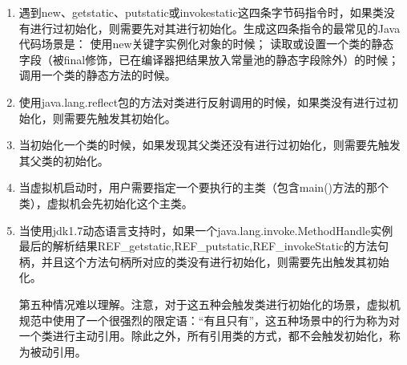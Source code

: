 \documentclass[../../../interview-questions.tex]{subfiles}
\begin{document}
\begin{enumerate}

\item{遇到new、getstatic、putstatic或invokestatic这四条字节码指令时，如果类没有进行过初始化，则需要先对其进行初始化。生成这四条指令的最常见的Java代码场景是：}
使用new关键字实例化对象的时候；
读取或设置一个类的静态字段（被final修饰，已在编译器把结果放入常量池的静态字段除外）的时候；
调用一个类的静态方法的时候。
\item{使用java.lang.reflect包的方法对类进行反射调用的时候，如果类没有进行过初始化，则需要先触发其初始化。}

\item{当初始化一个类的时候，如果发现其父类还没有进行过初始化，则需要先触发其父类的初始化。}

\item{当虚拟机启动时，用户需要指定一个要执行的主类（包含main()方法的那个类），虚拟机会先初始化这个主类。}

\item{当使用jdk1.7动态语言支持时，如果一个java.lang.invoke.MethodHandle实例最后的解析结果REF\_getstatic,REF\_putstatic,REF\_invokeStatic的方法句柄，并且这个方法句柄所对应的类没有进行初始化，则需要先出触发其初始化。}

第五种情况难以理解。注意，对于这五种会触发类进行初始化的场景，虚拟机规范中使用了一个很强烈的限定语：“有且只有”，这五种场景中的行为称为对一个类进行主动引用。除此之外，所有引用类的方式，都不会触发初始化，称为被动引用。

\end{enumerate}
\end{document}
